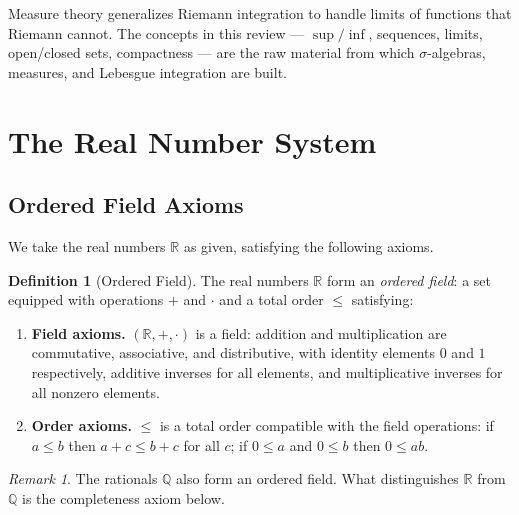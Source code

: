 \documentclass[11pt,a4paper]{article}
\theoremstyle{definition}
\newtheorem{definition}{Definition}[section]
\theoremstyle{plain}
\theoremstyle{remark}
\newtheorem{remark}{Remark}[section]
\newcommand{\R}{\mathbb{R}}
\newcommand{\Q}{\mathbb{Q}}
\begin{document}
\begin{rlconnection}
Measure theory generalizes Riemann integration to handle limits of functions that
Riemann cannot. The concepts in this review --- $\sup/\inf$, sequences, limits,
open/closed sets, compactness --- are the raw material from which $\sigma$-algebras,
measures, and Lebesgue integration are built.
\end{rlconnection}

\section{The Real Number System}
\label{sec:real_numbers}

\subsection{Ordered Field Axioms}
\label{subsec:ordered_field}

We take the real numbers $\R$ as given, satisfying the following axioms.

\begin{definition}[Ordered Field]
\label{def:ordered_field}
The real numbers $\R$ form an \emph{ordered field}: a set equipped with
operations $+$ and $\cdot$ and a total order $\le$ satisfying:
\begin{enumerate}[nosep,label=(\roman*)]
    \item \textbf{Field axioms.} $(\R, +, \cdot)$ is a field: addition and
    multiplication are commutative, associative, and distributive, with identity
    elements $0$ and $1$ respectively, additive inverses for all elements, and
    multiplicative inverses for all nonzero elements.
    \item \textbf{Order axioms.} $\le$ is a total order compatible with the field
    operations: if $a \le b$ then $a + c \le b + c$ for all $c$; if $0 \le a$ and
    $0 \le b$ then $0 \le ab$.
\end{enumerate}
\end{definition}

\begin{remark}
\label{rem:rational_field}
The rationals $\Q$ also form an ordered field. What distinguishes $\R$ from $\Q$
is the completeness axiom below.
\end{remark}
\end{document}
